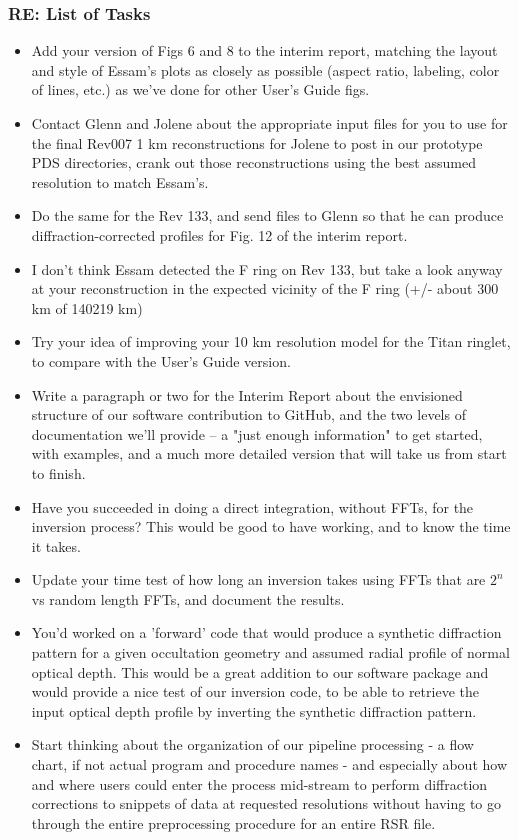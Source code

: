 \documentclass[crop=false,class=book]{standalone}
\begin{document}
\subsubsection{\footnotesize RE: List of Tasks}
\begin{itemize}
    \item Add your version of Figs 6 and 8 to the interim report, matching the layout and style of Essam's plots as closely as possible (aspect ratio, labeling, color of lines, etc.) as we've done for other User's Guide figs.
    \item Contact Glenn and Jolene about the appropriate input files for you to use for the final Rev007 1 km reconstructions for Jolene to post in our prototype PDS directories, crank out those reconstructions using the best assumed resolution to match Essam's.
    \item Do the same for the Rev 133, and send files to Glenn so that he can produce diffraction-corrected profiles for Fig. 12 of the interim report. 
    \item I don't think Essam detected the F ring on Rev 133, but take a look anyway at your reconstruction in the expected vicinity of the F ring (+/- about 300 km of 140219 km)
    \item Try your idea of improving your 10 km resolution model for the Titan ringlet, to compare with the User's Guide version. 
    \item Write a paragraph or two for the Interim Report about the envisioned structure of our software contribution to GitHub, and the two levels of documentation we'll provide -- a "just enough information" to get started, with examples, and a much more detailed version that will take us from start to finish.
    \item Have you succeeded in doing a direct integration, without FFTs, for the inversion process? This would be good to have working, and to know the time it takes.
    \item Update your time test of how long an inversion takes using FFTs that are $2^n$ vs random length FFTs, and document the results.
    \item You'd worked on a 'forward' code that would produce a synthetic diffraction pattern for a given occultation geometry and assumed radial profile of normal optical depth. This would be a great addition to our software package and would provide a nice test of our inversion code, to be able to retrieve the input optical depth profile by inverting the synthetic diffraction pattern.
    \item Start thinking about the organization of our pipeline processing - a flow chart, if not actual program and procedure names - and especially about how and where users could enter the process mid-stream to perform diffraction corrections to snippets of data at requested resolutions without having to go through the entire preprocessing procedure for an entire RSR file.

\end{itemize}
\end{document}
